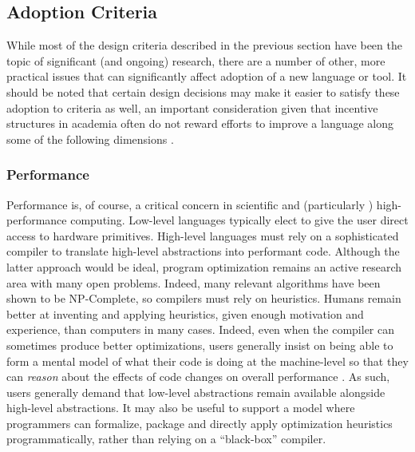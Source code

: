 \documentclass[12pt]{article}
\begin{document}
\subsection{Adoption Criteria}
While most of the design criteria described in the previous section have been the topic of significant (and ongoing) research, there are a number of other, more practical issues that can significantly affect adoption of a new language or tool. It should be noted that certain design decisions may make it easier to satisfy these adoption to criteria as well, an important consideration given that incentive structures in academia often do not reward efforts to improve a language along some of the following dimensions \cite{howison2011scientific}.

\subsubsection{Performance}
Performance is, of course, a critical concern in scientific and (particularly \cite{basili2008understanding}) high-performance computing. Low-level languages typically elect to give the user direct access to hardware primitives. High-level languages must rely on a sophisticated compiler to translate high-level abstractions into performant code. Although the latter approach would be ideal, program optimization remains an active research area with many open problems. Indeed, many relevant algorithms have been shown to be NP-Complete, so compilers must rely on heuristics. Humans remain better at inventing and applying heuristics, given enough motivation and experience, than computers in many cases. Indeed, even when the compiler can sometimes produce better optimizations, users generally insist on being able to form a mental model of what their code is doing at the machine-level so that they can {\it reason} about the effects of code changes on overall performance \cite{squires2005programmers}. As such, users generally demand that low-level abstractions remain available alongside high-level abstractions. It may also be useful to support a model where programmers can formalize, package and directly apply optimization heuristics programmatically, rather than relying on a ``black-box'' compiler.

\end{document}
